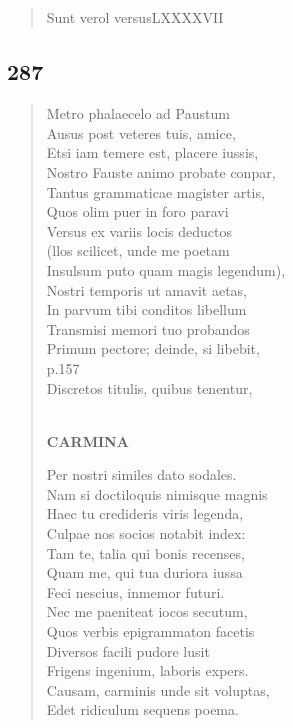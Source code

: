 \documentclass[11pt, a4paper]{report}
\begin{document}
            \subsection*{}
      \begin{verse}
      Sunt  \lbrack verol versusLXXXXVII \\ 
      \end{verse}
  
            \subsection*{287}
      \begin{verse}
      Metro phalaecelo ad Paustum \\ Ausus post veteres tuis, amice, \\ Etsi iam temere est, placere iussis, \\ Nostro Fauste animo probate conpar, \\ Tantus grammaticae magister artis, \\ Quos olim puer in foro paravi \\ Versus ex variis locis deductos \\ (llos scilicet, unde me poetam \\ Insulsum puto quam magis legendum), \\ Nostri temporis ut amavit aetas, \\ In parvum tibi conditos libellum \\ Transmisi memori tuo probandos \\ Primum pectore; deinde, si libebit, \\ p.157 \\ Discretos titulis, quibus tenentur, \\ 
        ﻿\pagebreak 
    \begin{center} \textbf{CARMINA} \end{center} \marginpar{[248]} Per nostri similes dato sodales. \\ Nam si doctiloquis nimisque magnis \\ Haec tu credideris viris legenda, \\ Culpae nos socios notabit index: \\ Tam te, talia qui bonis recenses, \\ Quam me, qui tua duriora iussa \\ Feci nescius, inmemor futuri. \\ Nec me paeniteat iocos secutum, \\ Quos verbis epigrammaton facetis \\ Diversos facili pudore lusit \\ Frigens ingenium, laboris expers. \\ Causam, carminis unde sit voluptas, \\ Edet ridiculum sequens poema. \\ 
      \end{verse}
  
\end{document}
